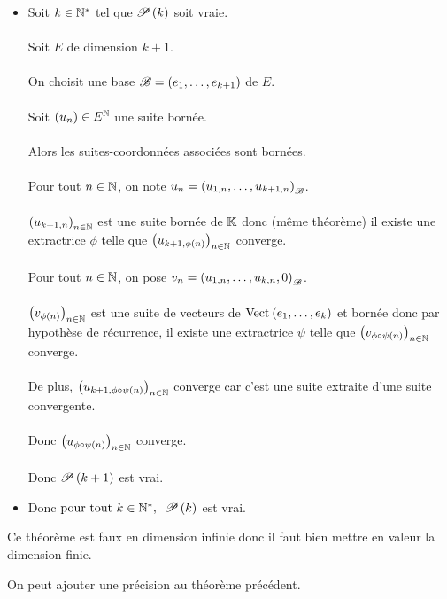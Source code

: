\begin{dem}
\begin{itemize}
    \item Soit \(k\in\Ns\) tel que \(\P{k}\) soit vraie. \\\\ Soit \(E\) de dimension \(k+1\). \\\\ On choisit une base \(\fami{B}=\paren{e_1,\dots,e_{k+1}}\) de \(E\). \\\\ Soit \(\paren{u_n}\in E^\N\) une suite bornée. \\\\ Alors les suites-coordonnées associées sont bornées. \\\\ Pour tout \(n\in\N\), on note \(u_n=\paren{u_{1,n},\dots,u_{k+1,n}}_\fami{B}\). \\\\ \(\paren{u_{k+1,n}}_{n\in\N}\) est une suite bornée de \(\K\) donc (même théorème) il existe une extractrice \(\phi\) telle que \(\paren{u_{k+1,\phi\paren{n}}}_{n\in\N}\) converge. \\\\ Pour tout \(n\in\N\), on pose \(v_n=\paren{u_{1,n},\dots,u_{k,n},0}_\fami{B}\). \\\\ \(\paren{v_{\phi\paren{n}}}_{n\in\N}\) est une suite de vecteurs de \(\Vect{e_1,\dots,e_k}\) et bornée donc par hypothèse de récurrence, il existe une extractrice \(\psi\) telle que \(\paren{v_{\phi\rond\psi\paren{n}}}_{n\in\N}\) converge. \\\\ De plus, \(\paren{u_{k+1,\phi\rond\psi\paren{n}}}_{n\in\N}\) converge car c'est une suite extraite d'une suite convergente. \\\\ Donc \(\paren{u_{\phi\rond\psi\paren{n}}}_{n\in\N}\) converge. \\\\ Donc \(\P{k+1}\) est vrai. \\
    \item Donc \(\quantifs{\tpt k\in\Ns}\P{k}\) est vrai.
\end{itemize}
\end{dem}

\begin{rem}
Ce théorème est faux en dimension infinie donc il faut bien mettre en valeur la dimension finie.
\end{rem}

On peut ajouter une précision au théorème précédent.

